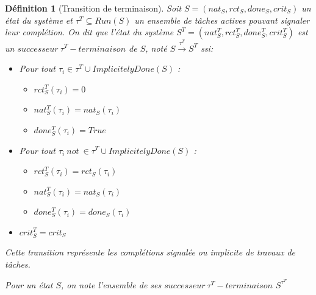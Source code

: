 \documentclass[a4paper]{report}
\theoremstyle{break}
\newtheorem{defin}{Définition}
\theoremstyle{breakplain}
\begin{document}
\begin{defin}[Transition de terminaison]
\label{tterm}
Soit $S = (nat_S, rct_S, done_S, crit_S)$ un état du système et $\tau^T \subseteq Run(S)$ un ensemble de tâches actives pouvant signaler leur complétion. On dit que l'état du système $S^T = (nat_S^T, rct_S^T, done_S^T, crit_S^T)$ est un $successeur\ \tau^T-terminaison$ de $S$, noté $S\xrightarrow{\tau^T}S^T$ ssi:
\begin{itemize}
\item Pour tout $\tau_i \in \tau^T \cup ImplicitelyDone(S)$ :\begin{itemize}
\item $rct_{S}^T(\tau_i) = 0$
\item $nat_{S}^T(\tau_i) = nat_{S}(\tau_i)$
\item $done_{S}^T(\tau_i) = True$
\end{itemize}

\item Pour tout $\tau_i\ not\ \in \tau^T \cup ImplicitelyDone(S)$ :\begin{itemize}
\item $rct_{S}^T(\tau_i) = rct_{S}(\tau_i)$
\item $nat_{S}^T(\tau_i) = nat_{S}(\tau_i)$
\item $done_{S}^T(\tau_i) = done_{S}(\tau_i)$
\end{itemize}
\item $crit_{S}^T = crit_{S}$

\end{itemize}
Cette transition représente les complétions signalée ou implicite de travaux de tâches.

Pour un état $S$, on note l'ensemble de ses $successeur\ \tau^T-terminaison$ $S^{\tau^T}$
\end{defin}
\end{document}
